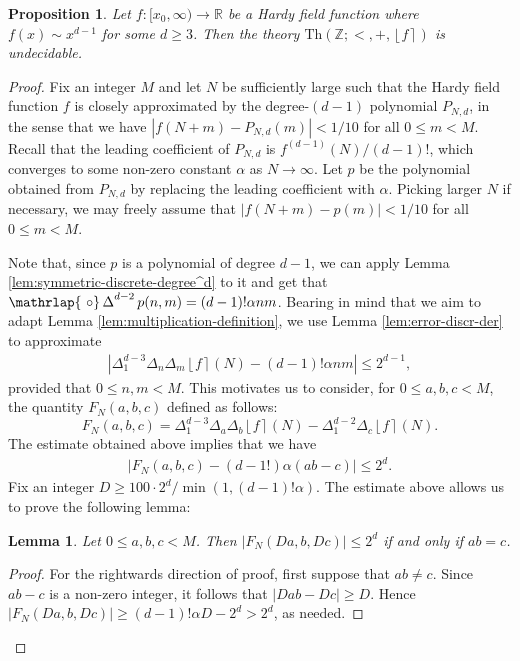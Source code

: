 \documentclass{amsart}
\newtheorem{proposition}[theorem]{Proposition}
\newtheorem{lemma}[theorem]{Lemma}
\theoremstyle{definition}
\newcommand{\nint}[1]{\left\lfloor #1 \right\rceil}
\newcommand{\abs}[1]{\left|#1\right|}
\renewcommand{\a}{\alpha}
\newcommand{\ZZ}{\mathbb{Z}}
\newcommand{\RR}{\mathbb{R}}
\newcommand{\DeltaS}{\operatorname{\mathrlap{\ \circ}\operatorname{\Delta}}}
\newcommand{\theory}[1]{\mathrm{Th}(#1)}
\begin{document}
\begin{proposition}
\label{prp:integer-exponent}
Let $f \colon [x_0,\infty) \to \RR$ be a Hardy field function where $f(x) \sim x^{d-1}$ for some $d \geq 3$. Then the theory $\theory{\ZZ; <, +, \nint{f}}$ is undecidable.
\end{proposition}
\begin{proof}

Fix an integer $M$ and let $N$ be sufficiently large such that the Hardy field function $f$ is closely approximated by the degree-$(d-1)$ polynomial $P_{N,d}$, in the sense that we have $\abs{f(N+m)-P_{N,d}(m)} < 1/10$ for all $0 \leq m < M$. Recall that the leading coefficient of $P_{N,d}$ is $f^{(d-1)}(N)/(d-1)!$, which converges to some non-zero constant $\a$ as $N \to \infty$. Let $p$ be the polynomial obtained from $P_{N,d}$ by replacing the leading coefficient with $\a$. Picking larger $N$ if necessary, we may freely assume that $\abs{f(N+m)-p(m)} < 1/10$ for all $0 \leq m < M$.

Note that, since $p$ is a polynomial of degree $d-1$, we can apply Lemma \ref{lem:symmetric-discrete-degree^d} to it and get that $\DeltaS^{d-2} p(n,m) = (d-1)! \a nm$. Bearing in mind that we aim to adapt Lemma \ref{lem:multiplication-definition}, we use Lemma \ref{lem:error-discr-der} to approximate
\begin{align*}
\abs{ \Delta_1^{d-3} \Delta_n \Delta_m \nint{f}(N) - (d-1)! \a nm } \leq 2^{d-1},
\end{align*}
provided that $0 \leq n,m < M$. This motivates us to consider, for $0 \leq a,b,c < M$, the quantity $F_N(a,b,c)$ defined as follows:
\begin{equation*}
F_N(a,b,c) = \Delta_1^{d-3} \Delta_a \Delta_b \nint{f}(N) - \Delta_1^{d-2} \Delta_c \nint{f}(N).
\end{equation*}
The estimate obtained above implies that we have
\begin{align*}
	\abs{ F_N(a,b,c) - (d-1!) \a (ab - c) } \leq 2^d.
\end{align*}
Fix an integer $D \geq {100 \cdot 2^d}/{\min(1,(d-1)!\a)}$. The estimate above allows us to prove the following lemma:
\begin{lemma} \label{lem:coarse-multiplication}
Let $0 \leq a,b,c < M$. Then $\abs{F_N(Da,b,Dc)} \leq 2^{d}$ if and only if $ab = c$.
\end{lemma}
\begin{proof}
For the rightwards direction of proof, first suppose that $ab \neq c$. Since $ab - c$ is a non-zero integer, it follows that $\abs{Dab-Dc} \geq D$. Hence $\abs{F_N(Da,b,Dc)} \geq (d-1)!\a D-2^d > 2^d$, as needed.


\end{proof}
\end{proof}
\end{document}
